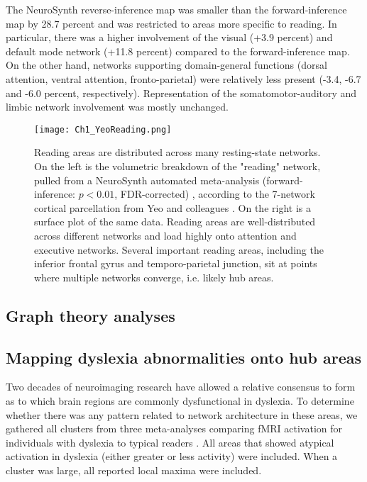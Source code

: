 The NeuroSynth reverse-inference map was smaller than the forward-inference map by 28.7 percent and was restricted to areas more specific to reading. In particular, there was a higher involvement of the visual (+3.9 percent) and default mode network (+11.8 percent) compared to the forward-inference map. On the other hand, networks supporting domain-general functions (dorsal attention, ventral attention, fronto-parietal) were relatively less present (-3.4, -6.7 and -6.0 percent, respectively). Representation of the somatomotor-auditory and limbic network involvement was mostly unchanged.

\begin{figure}
\centering
\texttt{[image: Ch1\_YeoReading.png]}
    \caption[Reading areas are distributed across many resting-state networks.]{Reading areas are distributed across many resting-state networks. On the left is the volumetric breakdown of the "reading" network, pulled from a NeuroSynth automated meta-analysis (forward-inference: $p < 0.01$, FDR-corrected) \cite{Yarkoni2011}, according to the 7-network cortical parcellation from Yeo and colleagues \cite{Yeo2011}. On the right is a surface plot of the same data. Reading areas are well-distributed across different networks and load highly onto attention and executive networks. Several important reading areas, including the inferior frontal gyrus and temporo-parietal junction, sit at points where multiple networks converge, i.e. likely hub areas.}
    \label{fig:texlogo}
\end{figure}



\subsection{Graph theory analyses}


\subsection{Mapping dyslexia abnormalities onto hub areas}
Two decades of neuroimaging research have allowed a relative consensus to form as to which brain regions are commonly dysfunctional in dyslexia. To determine whether there was any pattern related to network architecture in these areas, we gathered all clusters from three meta-analyses comparing fMRI activation for individuals with dyslexia to typical readers \cite{Maisog2008, Richlan2009, Paulesu2014}. All areas that showed atypical activation in dyslexia (either greater or less activity) were included. When a cluster was large, all reported local maxima were included. 

